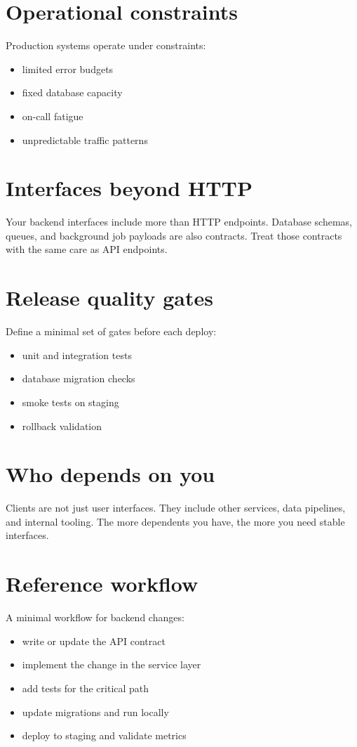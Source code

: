 \section{Operational constraints}
Production systems operate under constraints:
\begin{itemize}[nosep]
  \item limited error budgets
  \item fixed database capacity
  \item on-call fatigue
  \item unpredictable traffic patterns
\end{itemize}

\section{Interfaces beyond HTTP}
Your backend interfaces include more than HTTP endpoints.
Database schemas, queues, and background job payloads are also contracts.
Treat those contracts with the same care as API endpoints.

\section{Release quality gates}
Define a minimal set of gates before each deploy:
\begin{itemize}[nosep]
  \item unit and integration tests
  \item database migration checks
  \item smoke tests on staging
  \item rollback validation
\end{itemize}

\section{Who depends on you}
Clients are not just user interfaces.
They include other services, data pipelines, and internal tooling.
The more dependents you have, the more you need stable interfaces.

\section{Reference workflow}
A minimal workflow for backend changes:
\begin{itemize}[nosep]
  \item write or update the API contract
  \item implement the change in the service layer
  \item add tests for the critical path
  \item update migrations and run locally
  \item deploy to staging and validate metrics
\end{itemize}

